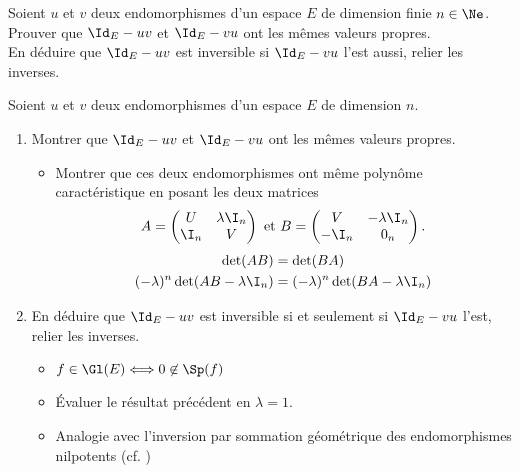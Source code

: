 \begin{exercice}
    Soient $u$ et $v$ deux endomorphismes d'un espace $E$ de dimension finie $n \in \Ne$. Prouver que $\Id_E - uv$ et $\Id_E - vu$ ont les mêmes valeurs propres. \\
    En déduire que $\Id_E - uv$ est inversible si $\Id_E - vu$ l'est aussi, relier les inverses.
\end{exercice}

Soient $u$ et $v$ deux endomorphismes d'un espace $E$ de dimension $n$.

\begin{enumerate}
    \item Montrer que $\Id_E-uv$ et $\Id_E-vu$ ont les mêmes valeurs propres.
    \begin{itemize}
        \item Montrer que ces deux endomorphismes ont même polynôme caractéristique en posant les deux matrices
        $$
        A = 
        \begin{pmatrix}
            U & \lambda \I_n \\
            \I_n & V
        \end{pmatrix}
        \text{ et }
        B = 
        \begin{pmatrix}
            V & -\lambda \I_n \\
            -\I_n & 0_n
        \end{pmatrix}.
        $$
        \begin{align*}
            \det(AB) &= \det(BA) \\
            (-\lambda)^n \det(AB - \lambda \I_n) &= (-\lambda)^n \det(BA - \lambda \I_n)
        \end{align*}
    \end{itemize}
    \item En déduire que $\Id_E-uv$ est inversible si et seulement si $\Id_E-vu$ l'est, relier les inverses. 
    \begin{itemize}
        \item $f \in \Gl(E) \Longleftrightarrow 0 \not \in \Sp(f)$
        \item Évaluer le résultat précédent en $\lambda = 1$.
        \item Analogie avec l'inversion par sommation géométrique des endomorphismes nilpotents (cf. )
    \end{itemize}
\end{enumerate}